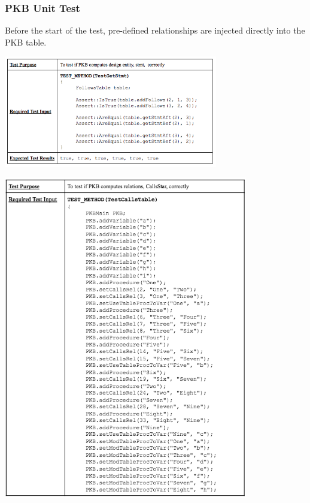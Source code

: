 \documentclass[12pt]{article}
\begin{document}
{{{{{{{{{{\subsubsection{PKB Unit Test}
Before the start of the test, pre-defined relationships are injected directly into the PKB table.
\begin{table}[!htbp]
  \centering 
 \includegraphics[width=0.7\textwidth]{UnitTest1.png}
\end{table}
\begin{table}[!htbp]
  \centering 
  \includegraphics[width=0.8\textwidth]{UnitTest2.png}
\end{table}
\begin{table}[!htbp]
  \centering 

\end{table}}}}}}}}}}}
\end{document}
